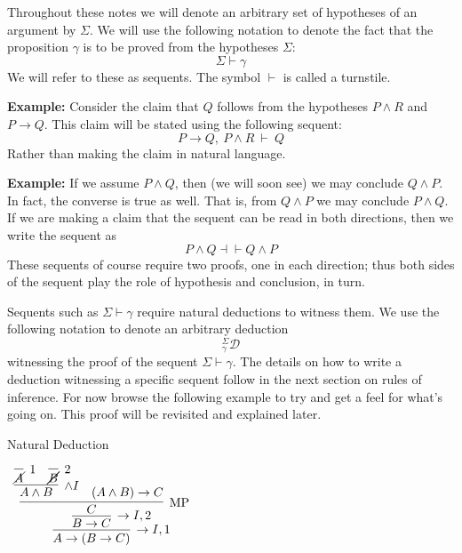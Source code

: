 \documentclass{book}
\begin{document}
    Throughout these notes we will denote an arbitrary set of hypotheses of an argument by $\Sigma$. We will use the following notation to denote the fact that the proposition $\gamma$ is to be proved from the hypotheses $\Sigma$: $$\Sigma \vdash \gamma$$ We will refer to these as sequents. The symbol $\vdash$ is called a turnstile. 

    {\bf Example:} Consider the claim that $Q$ follows from the hypotheses $P\land R$ and $P\to Q$. This claim will be stated using the following sequent: $$P \to Q, \ P \land R \ \vdash \ Q$$ Rather than making the claim in natural language. 

    {\bf Example:} If we assume $P \land Q$, then (we will soon see) we may conclude $Q \land P$. In fact, the converse is true as well. That is, from $Q \land P$ we may conclude $P \land Q$. If we are making a claim that the sequent can be read in both directions, then we write the sequent as $$P \land Q \dashv \vdash Q \land P $$ These sequents of course require two proofs, one in each direction; thus both sides of the sequent play the role of hypothesis and conclusion, in turn.

    Sequents such as $\Sigma \vdash \gamma$ require natural deductions to witness them. We use the following notation to denote an arbitrary deduction $$^{\Sigma}_{\gamma}\mathcal{D}$$ witnessing the proof of the sequent $\Sigma \vdash \gamma$. The details on how to write a deduction witnessing a specific sequent follow in the next section on rules of inference. For now browse the following example to try and get a feel for what's going on. This proof will be revisited and explained later. 

    \vspace{0.1cm}

    \begin{eg}{Natural Deduction}
            \begin{center}
                $\begin{array}{c}
                    \infer[\to I,1]{A \to (B \to C)}
                        {\infer[\to I,2]{B \to C}
                            {\infer[\MP]{C}
                                {\infer[\land I]{A \land B}
                                    {\infer[1]{\cancel{A}}{} & \infer[2]{\cancel{B}}{}}
                                &							
                                (A \land B) \to C}}}
                \end{array}$
            \end{center}
        \end{eg}
\end{document}
